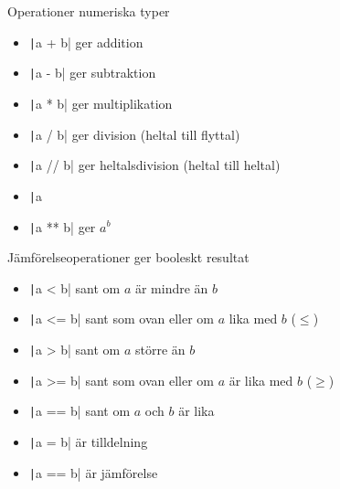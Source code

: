 \begin{frame}[fragile]
  \begin{block}{Operationer numeriska typer}
    \begin{itemize}
      \item \texttt|a + b| ger addition
      \item \texttt|a - b| ger subtraktion
      \item \texttt|a * b| ger multiplikation
      \item \texttt|a / b| ger division (heltal till flyttal)
      \item \texttt|a // b| ger heltalsdivision (heltal till heltal)
      \item \texttt|a %
      \item \texttt|a ** b| ger \(a^b\)
    \end{itemize}
  \end{block}
\end{frame}

\begin{frame}[fragile]
  \begin{block}{Jämförelseoperationer ger booleskt resultat}
    \begin{itemize}
      \item \texttt|a < b| sant om \(a\) är mindre än \(b\)
      \item \texttt|a <= b| sant som ovan eller om \(a\) lika med \(b\) 
        (\(\leq\))
      \item \texttt|a > b| sant om \(a\) större än \(b\)
      \item \texttt|a >= b| sant som ovan eller om \(a\) är lika med \(b\) 
        (\(\geq\))
      \item \texttt|a == b| sant om \(a\) och \(b\) är lika
    \end{itemize}
  \end{block}

  \pause

  \begin{remark}
    \begin{itemize}
      \item \texttt|a = b| är tilldelning
      \item \texttt|a == b| är jämförelse
    \end{itemize}
  \end{remark}
\end{frame}



